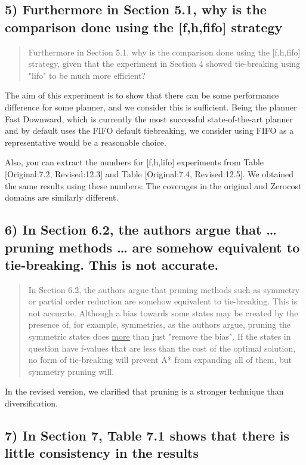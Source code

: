 \documentclass{article}
\begin{document}
\subsection{5) Furthermore in Section 5.1, why is the comparison done using the [f,h,fifo] strategy}
\label{sec:orgheadline29}

\begin{quote}
 Furthermore in Section 5.1, why is the comparison done using the
[f,h,fifo] strategy, given that the experiment in Section 4 showed
tie-breaking using "lifo" to be much more efficient?
\end{quote}

The aim of this experiment is to show that there can be some performance difference for some planner,
and we consider this is sufficient.
Being the planner Fast Downward, which is currently the most successful state-of-the-art planner
and by default uses the FIFO default tiebreaking,
we consider using FIFO as a representative would be a reasonable choice.

Also, you can extract the numbers for [f,h,lifo] experiments from
Table [Original:7.2, Revised:12.3] and Table [Original:7.4, Revised:12.5].
We obtained the same results using these numbers:
The coverages in the original and Zerocost domains are similarly different.

\subsection{6) In Section 6.2, the authors argue that \ldots{} pruning methods \ldots{} are somehow equivalent to tie-breaking. This is not accurate.}
\label{sec:orgheadline30}

\begin{quote}
 In Section 6.2, the authors argue that pruning methods such as
symmetry or partial order reduction are somehow equivalent to
tie-breaking. This is not accurate. Although a bias towards some
states may be created by the presence of, for example, symmetries, as
the authors argue, pruning the symmetric states does \underline{more} than just
"remove the bias". If the states in question have f-values that are
less than the cost of the optimal solution, no form of tie-breaking
will prevent A* from expanding all of them, but symmetry pruning will.
\end{quote}

In the revised version, we clarified that pruning is a stronger technique
than diversification.

\subsection{7) In Section 7, Table 7.1 shows that there is little consistency in the results}
\label{sec:orgheadline31}
\end{document}
